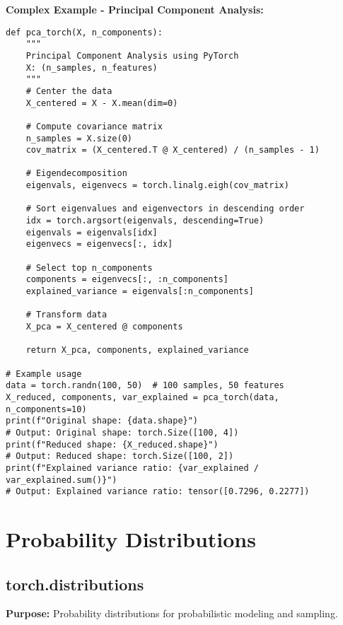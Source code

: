 \documentclass[11pt,a4paper]{book}
\begin{document}
\textbf{Complex Example - Principal Component Analysis:}
\begin{verbatim}
def pca_torch(X, n_components):
    """
    Principal Component Analysis using PyTorch
    X: (n_samples, n_features)
    """
    # Center the data
    X_centered = X - X.mean(dim=0)
    
    # Compute covariance matrix
    n_samples = X.size(0)
    cov_matrix = (X_centered.T @ X_centered) / (n_samples - 1)
    
    # Eigendecomposition
    eigenvals, eigenvecs = torch.linalg.eigh(cov_matrix)
    
    # Sort eigenvalues and eigenvectors in descending order
    idx = torch.argsort(eigenvals, descending=True)
    eigenvals = eigenvals[idx]
    eigenvecs = eigenvecs[:, idx]
    
    # Select top n_components
    components = eigenvecs[:, :n_components]
    explained_variance = eigenvals[:n_components]
    
    # Transform data
    X_pca = X_centered @ components
    
    return X_pca, components, explained_variance

# Example usage
data = torch.randn(100, 50)  # 100 samples, 50 features
X_reduced, components, var_explained = pca_torch(data, n_components=10)
print(f"Original shape: {data.shape}")
# Output: Original shape: torch.Size([100, 4])
print(f"Reduced shape: {X_reduced.shape}")
# Output: Reduced shape: torch.Size([100, 2])
print(f"Explained variance ratio: {var_explained / var_explained.sum()}")
# Output: Explained variance ratio: tensor([0.7296, 0.2277])
\end{verbatim}

\section{Probability Distributions}

\subsection{torch.distributions}

\textbf{Purpose:} Probability distributions for probabilistic modeling and sampling.
\end{document}
